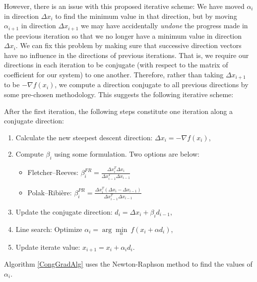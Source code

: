 However, there is an issue with this proposed iterative scheme: We have moved $\alpha_i$ in direction $\Delta x_i$ to find the minimum value in that direction, but by moving $\alpha_{i+1}$ in direction $\Delta x_{i+1}$ we may have accidentally \textit{undone} the progress made in the previous iteration so that we no longer have a minimum value in direction $\Delta x_i$. We can fix this problem by making sure that successive direction vectors have no influence in the directions of previous iterations. That is, we require our directions in each iteration to be conjugate (with respect to the matrix of coefficient for our system) to one another. Therefore, rather than taking $\Delta x_{i+1}$ to be $-\nabla f(x_i)$, we compute a direction conjugate to all previous directions by some pre-chosen methodology. This suggests the following iterative scheme:

After the first iteration, the following steps constitute one iteration along a conjugate direction:
\begin{enumerate}
	\item Calculate the new steepest descent direction: $\Delta x_i=-\nabla f(x_i)$,
	\item Compute $\beta_i$ using some formulation. Two options are below:
	\begin{itemize}
		\item Fletcher--Reeves: $\beta_i^{FR}=\frac{\Delta x_i^T\Delta x_i}{\Delta x_{i-1}^T\Delta x_{i-1}}$
		\item Polak--Ribi\`{e}re: $\beta_{i}^{PR}=\frac{\Delta x_i^T(\Delta x_i-\Delta x_{i-1})}{\Delta x_{i-1}^T\Delta x_{i-1}}$
	\end{itemize}
	\item Update the conjugate direction: $d_i=\Delta x_i+\beta_i d_{i-1}$,
	\item Line search: Optimize $\alpha_i =\arg\underset{\alpha}{\min}\ f(x_i+\alpha d_i)$,
	\item Update iterate value: $x_{i+1}=x_i+\alpha_i d_i$.
\end{enumerate}

Algorithm \ref{CongGradAlg} uses the Newton-Raphson method to find the values of $\alpha_i$.

